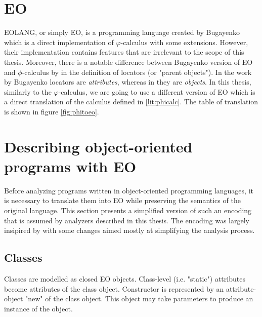 


\section{EO}
\label{lit:eo}
EOLANG, or simply EO, is a programming language created by Bugayenko \cite{eolang} which is a direct implementation of $\varphi$-calculus with some extensions. However, their implementation contains features that are irrelevant to the scope of this thesis. Moreover, there is a notable difference between Bugayenko version of EO and $\phi$-calculus by \cite{kudasov} in the definition of locators (or "parent objects"). In the work by Bugayenko locators are \textit{attributes}, whereas in \cite{kudasov} they are \textit{objects}. In this thesis, similarly to the $\varphi$-calculus, we are going to use a different version of EO which is a direct translation of the calculus defined in \ref{lit:phicalc}. The table of translation is shown in figure \ref{fig:phitoeo}.



\section{Describing object-oriented programs with EO}
\label{lit:encoding}
Before analyzing programs written in object-oriented programming languages, it is necessary to translate them into EO while preserving the semantics of the original language. This section presents a simplified version of such an encoding that is assumed by analyzers described in this thesis. The encoding was largely insipired by \cite{bugayenko_reducing_2021} with some changes aimed mostly at simplifying the analysis process.

\subsection{Classes}
Classes are modelled as closed EO objects. Class-level (i.e. "static") attributes become attributes of the class object. Constructor is represented by an attribute-object "new" of the class object. This object may take parameters to produce an instance of the object.

